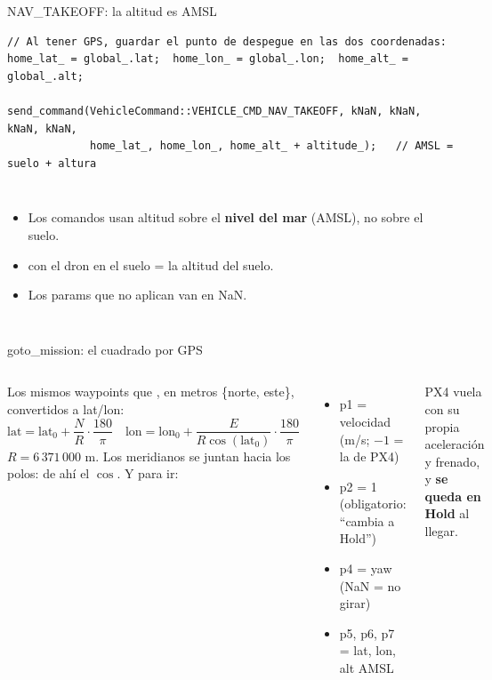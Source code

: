\begin{frame}[fragile]{NAV\_TAKEOFF: la altitud es AMSL}
  \begin{lstlisting}[style=cpp,caption={goto\_mission.cpp}]
// Al tener GPS, guardar el punto de despegue en las dos coordenadas:
home_lat_ = global_.lat;  home_lon_ = global_.lon;  home_alt_ = global_.alt;

send_command(VehicleCommand::VEHICLE_CMD_NAV_TAKEOFF, kNaN, kNaN, kNaN, kNaN,
             home_lat_, home_lon_, home_alt_ + altitude_);   // AMSL = suelo + altura
  \end{lstlisting}
  \begin{columns}[c]
    \small
    \begin{itemize}
      \item Los comandos usan altitud sobre el \textbf{nivel del mar} (AMSL), no sobre el suelo.
      \item {} con el dron en el suelo = la altitud del suelo.
      \item Los params que no aplican van en NaN.
    \end{itemize}
    \centering
  \end{columns}
\end{frame}

\begin{frame}{goto\_mission: el cuadrado por GPS}
  \begin{columns}[c]
    \small
    Los mismos waypoints que , en metros \{norte, este\}, convertidos a lat/lon:
    \[
      \text{lat} = \text{lat}_0 + \frac{N}{R}\cdot\frac{180}{\pi}
      \quad
      \text{lon} = \text{lon}_0 + \frac{E}{R\cos(\text{lat}_0)}\cdot\frac{180}{\pi}
    \]
    $R = 6\,371\,000$ m. Los meridianos se juntan hacia los polos: de ahí el $\cos$.
    \small
    Y para ir: 
    \begin{itemize}
      \item p1 = velocidad (m/s; $-1$ = la de PX4)
      \item p2 = 1 (obligatorio: ``cambia a Hold'')
      \item p4 = yaw (NaN = no girar)
      \item p5, p6, p7 = lat, lon, alt AMSL
    \end{itemize}
    PX4 vuela con su propia aceleración y frenado, y \textbf{se queda en Hold} al llegar.
  \end{columns}
\end{frame}

